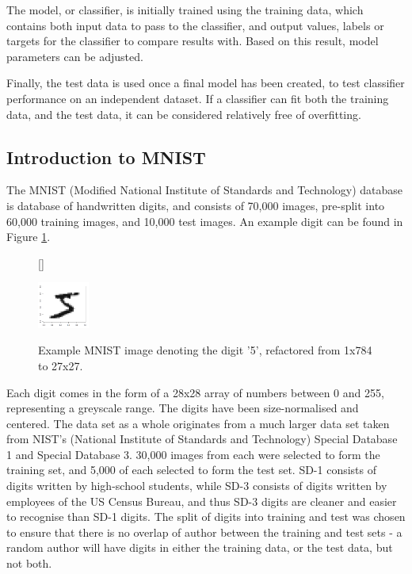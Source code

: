 \documentclass[11pt]{article} %
\begin{document}
The model, or classifier, is initially trained using the training data, which contains both input data to pass to the classifier, and output values, labels or targets for the classifier to compare results with. Based on this result, model parameters can be adjusted. 

Finally, the test data is used once a final model has been created, to test classifier performance on an independent dataset. If a classifier can fit both the training data, and the test data, it can be considered relatively free of overfitting. 


\subsection{Introduction to MNIST}

The MNIST (Modified National Institute of Standards and Technology) database is database of handwritten digits, and consists of 70,000 images, pre-split into 60,000 training images, and 10,000 test images. An example digit can be found in Figure \ref{fig:mnist_example}.



\begin{figure}[htb!]
[\FBwidth]
{\caption{Example MNIST image denoting the digit '5', refactored from 1x784 to 27x27.}\label{fig:mnist_example}}
{\includegraphics[width=0.15\textwidth]{mnist_example.png}}
\end{figure}

Each digit comes in the form of a 28x28 array of numbers between 0 and 255, representing a greyscale range. The digits have been size-normalised and centered. The data set as a whole originates from a much larger data set taken from NIST's (National Institute of Standards and Technology) Special Database 1 and Special Database 3. 30,000 images from each were selected to form the training set, and 5,000 of each selected to form the test set. SD-1 consists of digits written by high-school students, while SD-3 consists of digits written by employees of the US Census Bureau, and thus SD-3 digits are cleaner and easier to recognise than SD-1 digits. The split of digits into training and test was chosen to ensure that there is no overlap of author between the training and test sets - a random author will have digits in either the training data, or the test data, but not both. \cite{mnist-website}
\end{document}
